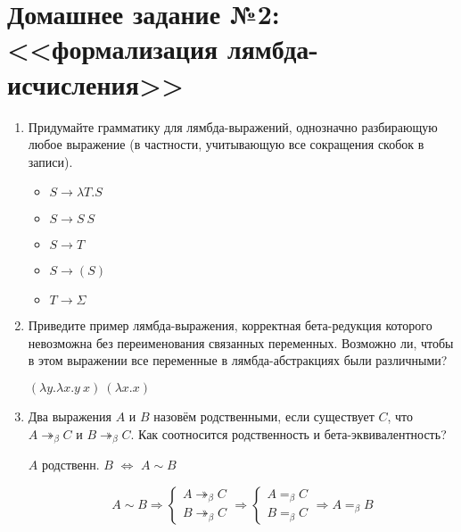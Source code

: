 

\cfoot{}



\section*{Домашнее задание №2: <<формализация лямбда-исчисления>>}

\begin{enumerate}
    \item Придумайте грамматику для лямбда-выражений, однозначно разбирающую любое выражение
          (в частности, учитывающую все сокращения скобок в записи).
          \begin{solution}\itemfix
              \begin{itemize}
                  \item \(S \to \lambda T.S\)
                  \item \(S \to S\ S\)
                  \item \(S \to T\)
                  \item \(S \to (S)\)
                  \item \(T \to \Sigma\)
              \end{itemize}
          \end{solution}
    \item Приведите пример лямбда-выражения, корректная бета-редукция которого невозможна без переименования
          связанных переменных. Возможно ли, чтобы в этом выражении все переменные в лямбда-абстракциях
          были различными?
          \begin{solution}
              \((\lambda y.\lambda x.y\ x)\ (\lambda x.x)\)
          \end{solution}
    \item Два выражения $A$ и $B$ назовём родственными, если существует $C$, что
          $A \twoheadrightarrow_\beta C$ и $B \twoheadrightarrow_\beta C$.
          Как соотносится родственность и бета-эквивалентность?
          \begin{solution}
              \begin{notation}
                  \(A\) родственн. \(B\) \(\Leftrightarrow\) \(A \sim B\)
              \end{notation}

              \[A \sim B \Rightarrow \begin{cases}
                      A \twoheadrightarrow_\beta C \\
                      B \twoheadrightarrow_\beta C
                  \end{cases} \Rightarrow \begin{cases}
                      A =_\beta C \\
                      B =_\beta C
                  \end{cases} \Rightarrow A =_\beta B\]


\end{solution}
\end{enumerate}
